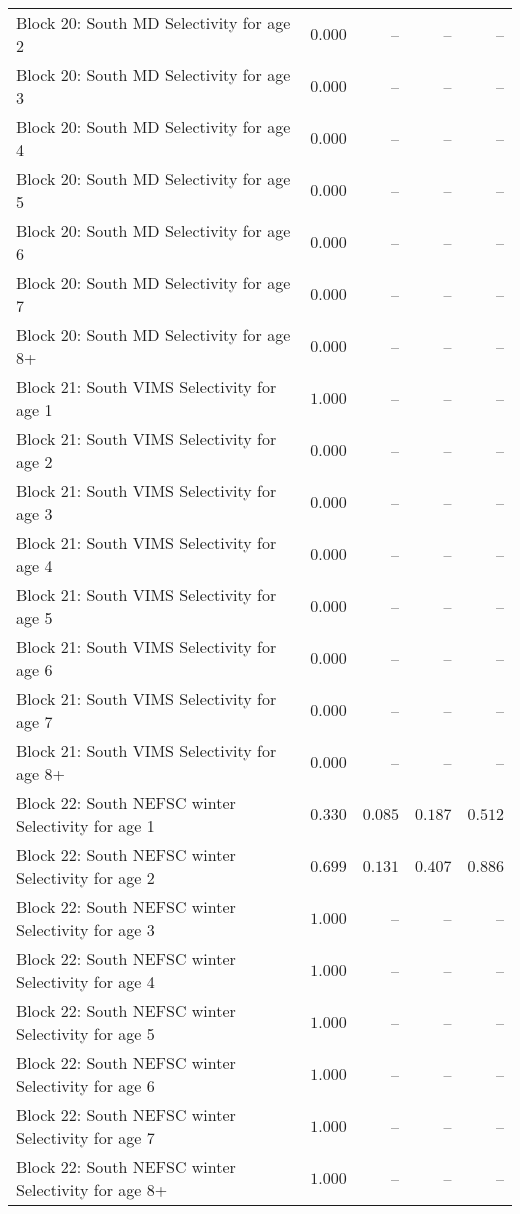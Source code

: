 \documentclass[
]{article}
\begin{document}
\begin{landscape}
\begin{longtable}[t]{lrrrr}
\addlinespace
Block 20: South MD Selectivity for age 2 & $0.000$ & -- & -- & --\\
Block 20: South MD Selectivity for age 3 & $0.000$ & -- & -- & --\\
Block 20: South MD Selectivity for age 4 & $0.000$ & -- & -- & --\\
Block 20: South MD Selectivity for age 5 & $0.000$ & -- & -- & --\\
Block 20: South MD Selectivity for age 6 & $0.000$ & -- & -- & --\\
\addlinespace
Block 20: South MD Selectivity for age 7 & $0.000$ & -- & -- & --\\
Block 20: South MD Selectivity for age 8+ & $0.000$ & -- & -- & --\\
Block 21: South VIMS Selectivity for age 1 & $1.000$ & -- & -- & --\\
Block 21: South VIMS Selectivity for age 2 & $0.000$ & -- & -- & --\\
Block 21: South VIMS Selectivity for age 3 & $0.000$ & -- & -- & --\\
\addlinespace
Block 21: South VIMS Selectivity for age 4 & $0.000$ & -- & -- & --\\
Block 21: South VIMS Selectivity for age 5 & $0.000$ & -- & -- & --\\
Block 21: South VIMS Selectivity for age 6 & $0.000$ & -- & -- & --\\
Block 21: South VIMS Selectivity for age 7 & $0.000$ & -- & -- & --\\
Block 21: South VIMS Selectivity for age 8+ & $0.000$ & -- & -- & --\\
\addlinespace
Block 22: South NEFSC winter Selectivity for age 1 & $0.330$ & $0.085$ & $0.187$ & $0.512$\\
Block 22: South NEFSC winter Selectivity for age 2 & $0.699$ & $0.131$ & $0.407$ & $0.886$\\
Block 22: South NEFSC winter Selectivity for age 3 & $1.000$ & -- & -- & --\\
Block 22: South NEFSC winter Selectivity for age 4 & $1.000$ & -- & -- & --\\
Block 22: South NEFSC winter Selectivity for age 5 & $1.000$ & -- & -- & --\\
\addlinespace
Block 22: South NEFSC winter Selectivity for age 6 & $1.000$ & -- & -- & --\\
Block 22: South NEFSC winter Selectivity for age 7 & $1.000$ & -- & -- & --\\
Block 22: South NEFSC winter Selectivity for age 8+ & $1.000$ & -- & -- & --\\

\end{longtable}
\end{landscape}
\end{document}
